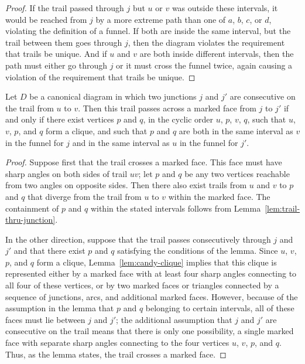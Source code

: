 \documentclass{llncs}
\begin{document}
\begin{proof}
If the trail
passed through $j$ but $u$ or $v$ was outside these intervals, it would be
reached from $j$ by a more extreme path than one of $a$, $b$, $c$, or $d$,
violating the definition of a funnel. If both are inside the same interval, but the trail between them goes through $j$, then the diagram violates the requirement that trails be unique.
And if $u$ and $v$ are both inside
different intervals, then the path must either go through $j$ or it must
cross the funnel twice, again causing a violation of the requirement that trails be unique.
\end{proof}

\begin{lemma}
\label{lem:trail-across-mark}
Let $D$ be a canonical diagram in which two junctions $j$ and $j'$ are consecutive on the trail from $u$ to $v$. Then this trail passes across a marked face from $j$ to $j'$ if and only if there exist vertices $p$ and $q$, in the cyclic order $u$, $p$, $v$, $q$, such that $u$, $v$, $p$, and $q$ form a clique, and such that $p$ and $q$ are both in the same interval as $v$ in the funnel for $j$ and in the same interval as $u$ in the funnel for $j'$.
\end{lemma}

\begin{proof}
Suppose first that the trail crosses a marked face. This face must have sharp angles on both sides of trail $uv$; let $p$ and $q$ be any two vertices reachable from two angles on opposite sides.  Then there also exist trails from $u$ and $v$ to $p$ and $q$ that diverge from the trail from $u$ to $v$ within the marked face. The containment of $p$ and $q$ within the stated intervals follows from Lemma~\ref{lem:trail-thru-junction}.

In the other direction, suppose that the trail passes consecutively through $j$ and $j'$ and that there exist $p$ and $q$ satisfying the conditions of the lemma. Since $u$, $v$, $p$, and $q$ form a clique, Lemma~\ref{lem:candy-clique} implies that this clique is represented either by a marked face with at least four sharp angles connecting to all four of these vertices, or by two marked faces or triangles connected by a sequence of junctions, arcs, and additional marked faces. However, because of the assumption in the lemma that $p$ and $q$ belonging to certain intervals, all of these faces must lie between $j$ and $j'$; the additional assumption that $j$ and $j'$ are consecutive on the trail means that there is only one possibility, a single marked face with separate sharp angles connecting to the four vertices $u$, $v$, $p$, and $q$. Thus, as the lemma states, the trail crosses a marked face.
\end{proof}
\end{document}
